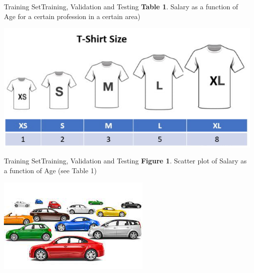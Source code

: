 \documentclass[11pt]{beamer}
\begin{document}
\begin{frame}{Training Set}{Training, Validation and Testing}
\textbf{Table 1}. Salary as a function of Age for a certain profession in a certain area)
	\begin{center}
	\includegraphics[scale=.6]{../05-pictures/lesson-2-2_pic_0.png}
	\end{center}
\end{frame}
\begin{frame}{Training Set}{Training, Validation and Testing}
\textbf{Figure 1}. Scatter plot of Salary as a function of Age (see Table 1)
	\begin{center}
	\includegraphics[scale=.6]{../05-pictures/lesson-2-2_pic_1.png}
	\end{center}
\end{frame}
\end{document}
